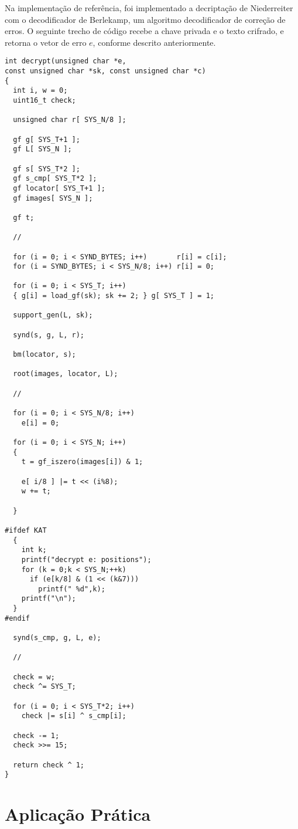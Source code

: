 Na implementação de referência, foi implementado a decriptação de Niederreiter com o decodificador de Berlekamp, um algoritmo decodificador de correção de erros. O seguinte trecho de código recebe a chave privada e o texto crifrado, e retorna o vetor de erro $e$, conforme descrito anteriormente.

\begin{verbatim}
int decrypt(unsigned char *e, 
const unsigned char *sk, const unsigned char *c)
{
  int i, w = 0; 
  uint16_t check;  

  unsigned char r[ SYS_N/8 ];

  gf g[ SYS_T+1 ];
  gf L[ SYS_N ];

  gf s[ SYS_T*2 ];
  gf s_cmp[ SYS_T*2 ];
  gf locator[ SYS_T+1 ];
  gf images[ SYS_N ];

  gf t;

  //

  for (i = 0; i < SYND_BYTES; i++)       r[i] = c[i];
  for (i = SYND_BYTES; i < SYS_N/8; i++) r[i] = 0;

  for (i = 0; i < SYS_T; i++) 
  { g[i] = load_gf(sk); sk += 2; } g[ SYS_T ] = 1;

  support_gen(L, sk);

  synd(s, g, L, r);

  bm(locator, s);

  root(images, locator, L);

  //
  
  for (i = 0; i < SYS_N/8; i++) 
    e[i] = 0;

  for (i = 0; i < SYS_N; i++)
  {
    t = gf_iszero(images[i]) & 1;

    e[ i/8 ] |= t << (i%8);
    w += t;

  }

#ifdef KAT
  {
    int k;
    printf("decrypt e: positions");
    for (k = 0;k < SYS_N;++k)
      if (e[k/8] & (1 << (k&7)))
        printf(" %d",k);
    printf("\n");
  }
#endif
  
  synd(s_cmp, g, L, e);

  //

  check = w;
  check ^= SYS_T;

  for (i = 0; i < SYS_T*2; i++)
    check |= s[i] ^ s_cmp[i]; 

  check -= 1;
  check >>= 15;

  return check ^ 1;
}
\end{verbatim}

\section{Aplicação Prática}

